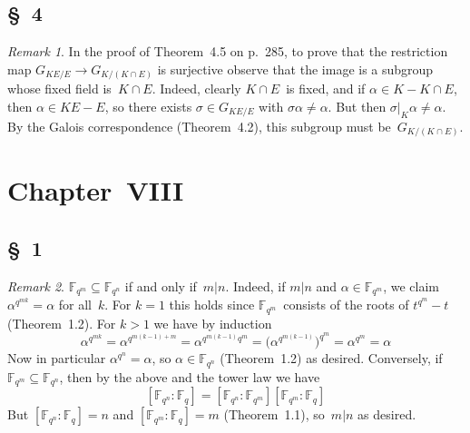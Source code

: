 \documentclass[letterpaper,12pt]{article}
\newcommand{\F}{\mathbb{F}}
\newcommand{\sect}{\cap}
\theoremstyle{definition}
\theoremstyle{remark}
\newtheorem*{rmk}{Remark}
\theoremstyle{direction}
\begin{document}
\subsection*{\S~4}
\begin{rmk}
In the proof of Theorem~4.5 on p.~285, to prove that the restriction map \(G_{KE/E}\to G_{K/(K\sect E)}\) is surjective observe that the image is a subgroup whose fixed field is~\(K\sect E\). Indeed, clearly \(K\sect E\)~is fixed, and if \(\alpha\in K-K\sect E\), then \(\alpha\in KE-E\), so there exists \(\sigma\in G_{KE/E}\) with \(\sigma\alpha\ne\alpha\). But then \(\sigma|_K\alpha\ne\alpha\). By the Galois correspondence (Theorem~4.2), this subgroup must be~\(G_{K/(K\sect E)}\).
\end{rmk}

\section*{Chapter~VIII}

\subsection*{\S~1}
\begin{rmk}
\(\F_{q^m}\subseteq\F_{q^n}\) if and only if~\(m|n\). Indeed, if \(m|n\) and \(\alpha\in\F_{q^m}\), we claim \(\alpha^{q^{mk}}=\alpha\) for all~\(k\). For \(k=1\) this holds since \(\F_{q^m}\)~consists of the roots of \(t^{q^m}-t\) (Theorem~1.2). For \(k>1\) we have by induction
\[\alpha^{q^{mk}}=\alpha^{q^{m(k-1)+m}}=\alpha^{q^{m(k-1)}q^m}=\bigl(\alpha^{q^{m(k-1)}}\bigr)^{q^m}=\alpha^{q^m}=\alpha\]
Now in particular \(\alpha^{q^n}=\alpha\), so \(\alpha\in\F_{q^n}\) (Theorem~1.2) as desired. Conversely, if \(\F_{q^m}\subseteq\F_{q^n}\), then by the above and the tower law we have
\[[\F_{q^n}:\F_q]=[\F_{q^n}:\F_{q^m}][\F_{q^m}:\F_q]\]
But \([\F_{q^n}:\F_q]=n\) and \([\F_{q^m}:\F_q]=m\) (Theorem~1.1), so~\(m|n\) as desired.
\end{rmk}
\end{document}
